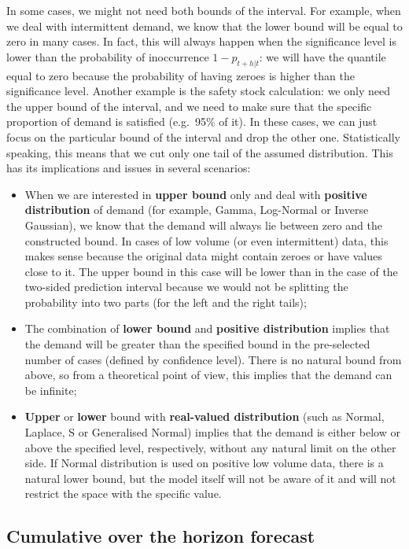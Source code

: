 \documentclass[]{book}
\providecommand{\tightlist}{%
  \setlength{\itemsep}{0pt}\setlength{\parskip}{0pt}}
\theoremstyle{definition}
\theoremstyle{definition}
\theoremstyle{definition}
\theoremstyle{definition}
\theoremstyle{remark}
\begin{document}
In some cases, we might not need both bounds of the interval. For example, when we deal with intermittent demand, we know that the lower bound will be equal to zero in many cases. In fact, this will always happen when the significance level is lower than the probability of inoccurrence \(1-p_{t+h|t}\): we will have the quantile equal to zero because the probability of having zeroes is higher than the significance level. Another example is the safety stock calculation: we only need the upper bound of the interval, and we need to make sure that the specific proportion of demand is satisfied (e.g.~95\% of it). In these cases, we can just focus on the particular bound of the interval and drop the other one. Statistically speaking, this means that we cut only one tail of the assumed distribution. This has its implications and issues in several scenarios:

\begin{itemize}
\tightlist
\item
  When we are interested in \textbf{upper bound} only and deal with \textbf{positive distribution} of demand (for example, Gamma, Log-Normal or Inverse Gaussian), we know that the demand will always lie between zero and the constructed bound. In cases of low volume (or even intermittent) data, this makes sense because the original data might contain zeroes or have values close to it. The upper bound in this case will be lower than in the case of the two-sided prediction interval because we would not be splitting the probability into two parts (for the left and the right tails);
\item
  The combination of \textbf{lower bound} and \textbf{positive distribution} implies that the demand will be greater than the specified bound in the pre-selected number of cases (defined by confidence level). There is no natural bound from above, so from a theoretical point of view, this implies that the demand can be infinite;
\item
  \textbf{Upper} or \textbf{lower} bound with \textbf{real-valued distribution} (such as Normal, Laplace, S or Generalised Normal) implies that the demand is either below or above the specified level, respectively, without any natural limit on the other side. If Normal distribution is used on positive low volume data, there is a natural lower bound, but the model itself will not be aware of it and will not restrict the space with the specific value.
\end{itemize}

\hypertarget{forecastingADAMOtherCumulative}{%
\subsection{Cumulative over the horizon forecast}\label{forecastingADAMOtherCumulative}}
\end{document}
